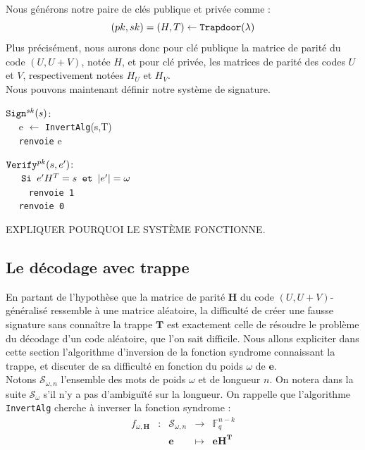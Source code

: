 \documentclass[12pt]{article}
\theoremstyle{plain}
\theoremstyle{definition}
\newcommand{\F}{\mathbb{F}}
\newcommand{\e}{\mathbf{e}}
\begin{document}
\noindent Nous générons notre paire de clés publique et privée comme :
$$ (pk, sk) = (H,T) \leftarrow \verb|Trapdoor|(\lambda)$$
Plus précisément, nous aurons donc pour clé publique la matrice de parité du code $(U,U+V)$, notée $H$, et pour clé privée, les matrices de parité des codes $U$ et $V$, respectivement notées $H_U$ et $H_V$.\\
Nous pouvons maintenant définir notre système de signature.
\begin{multicols}{2}
\begin{flushleft}
$\verb|Sign|^{sk}(s)$:\\
	$\quad$ e $\leftarrow$  \verb|InvertAlg|(s,T) \\
	$\quad$ \verb|renvoie| e
\end{flushleft}
\begin{flushleft}
$\verb|Verify|^{pk}(s,e')$: \\
	$\quad \verb| Si | e'H^T = s \verb| et | |e'| = \omega $ \\
	$\quad \quad$ \verb|renvoie 1| \\
	$\quad$ \verb|renvoie 0|
\end{flushleft}
\end{multicols}

EXPLIQUER POURQUOI LE SYSTÈME FONCTIONNE.

\subsection{Le décodage avec trappe}

En partant de l'hypothèse que la matrice de parité $\mathbf{H}$ du code $(U,U+V)$-généralisé ressemble à une matrice aléatoire, la difficulté de créer une fausse signature sans connaître la trappe $\mathbf{T}$ est exactement celle de résoudre le problème du décodage d'un code aléatoire, que l'on sait difficile. Nous allons expliciter dans cette section l'algorithme d'inversion de la fonction syndrome connaissant la trappe, et discuter de sa difficulté en fonction du poids $\omega$ de $\e$. \\

\noindent Notons $\mathcal{S}_{\omega,n}$ l'ensemble des mots de poids $\omega$ et de longueur $n$. On notera dans la suite $\mathcal{S}_{\omega}$ s'il n'y a pas d’ambiguïté sur la longueur. On rappelle que l'algorithme \verb|InvertAlg| cherche à inverser la fonction syndrome : 
$$\begin{array}{ccccc}
f_{\omega,\mathbf{H}} & : & \mathcal{S}_{\omega,n} & \to & \F_q^{n-k} \\
 & & \mathbf{e} & \mapsto & \mathbf{eH^T} \\
\end{array}$$
\end{document}
